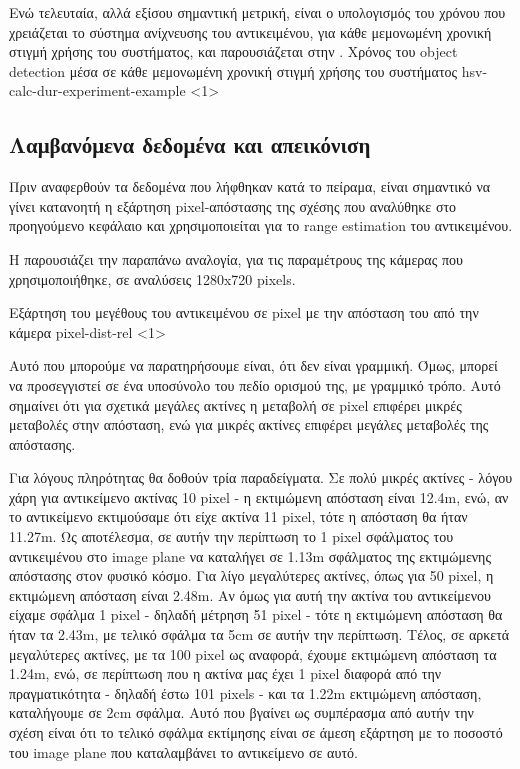 Ενώ τελευταία, αλλά εξίσου σημαντική μετρική, είναι ο υπολογισμός του χρόνου που χρειάζεται το σύστημα ανίχνευσης του αντικειμένου, για κάθε μεμονωμένη χρονική στιγμή χρήσης του συστήματος, και παρουσιάζεται στην .
{Χρόνος του object detection μέσα σε κάθε με\-μο\-νω\-μέ\-νη χρονική στιγμή χρήσης του συστήματος}%
{hsv-calc-dur-experiment-example}%
<1>


\subsection{Λαμβανόμενα δεδομένα και απεικόνιση} \label{sec:expe-single-3d}

Πριν αναφερθούν τα δεδομένα που λήφθηκαν κατά το πείραμα, είναι σημαντικό να γίνει κατανοητή η εξάρτηση pixel-απόστασης της σχέσης  που αναλύθηκε στο προηγούμενο κεφάλαιο και χρησιμοποιείται για το range estimation του αντικειμένου.

Η  παρουσιάζει την παραπάνω αναλογία, για τις παραμέτρους της κάμερας που χρησιμοποιήθηκε, σε αναλύσεις 1280x720 pixels.

{Εξάρτηση του μεγέθους του αντικειμένου σε pixel με την απόσταση του από την κάμερα}%
{pixel-dist-rel}%
<1>

Αυτό που μπορούμε να παρατηρήσουμε είναι, ότι δεν είναι γραμμική. Όμως, μπορεί να προσεγγιστεί σε ένα υποσύνολο του πεδίο ορισμού της, με γραμμικό τρόπο. Αυτό σημαίνει ότι για σχετικά μεγάλες ακτίνες η μεταβολή σε pixel επιφέρει μικρές με\-τα\-βο\-λές στην απόσταση, ενώ για μικρές ακτίνες επιφέρει μεγάλες μεταβολές της απόστασης. 

Για λόγους πληρότητας θα δοθούν τρία παραδείγματα. Σε πολύ μικρές ακτίνες - λόγου χάρη για αντικείμενο ακτίνας 10 pixel - η εκτιμώμενη απόσταση είναι 12.4m, ενώ, αν το αντικείμενο εκτιμούσαμε ότι είχε ακτίνα 11 pixel, τότε η απόσταση θα ήταν 11.27m. Ως αποτέλεσμα, σε αυτήν την περίπτωση το 1 pixel σφάλματος του αντικειμένου στο image plane να καταλήγει σε 1.13m σφάλματος της εκτιμώμενης απόστασης στον φυσικό κόσμο. Για λίγο μεγαλύτερες ακτίνες, όπως για 50 pixel, η εκτιμώμενη απόσταση είναι 2.48m. Αν όμως για αυτή την ακτίνα του αντικείμενου είχαμε σφάλμα 1 pixel - δηλαδή μέτρηση 51 pixel - τότε η εκτιμώμενη απόσταση θα ήταν τα 2.43m, με τελικό σφάλμα τα 5cm σε αυτήν την περίπτωση. Τέλος, σε αρκετά μεγαλύτερες ακτίνες, με τα 100 pixel ως αναφορά, έχουμε εκτιμώμενη α\-πό\-στα\-ση τα 1.24m, ενώ, σε περίπτωση που η ακτίνα μας έχει 1 pixel διαφορά από την πραγματικότητα - δηλαδή έστω 101 pixels - και τα 1.22m εκτιμώμενη απόσταση, καταλήγουμε σε 2cm σφάλμα. Αυτό που βγαίνει ως συμπέρασμα από αυτήν την σχέση είναι ότι το τελικό σφάλμα εκτίμησης είναι σε άμεση εξάρτηση με το ποσοστό του image plane που καταλαμβάνει το αντικείμενο σε αυτό. 

